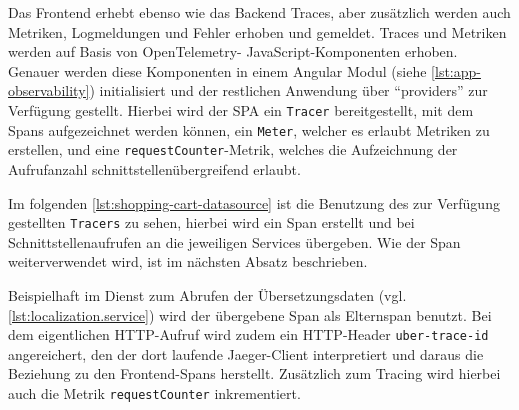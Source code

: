 Das Frontend erhebt ebenso wie das Backend Traces, aber zusätzlich werden auch Metriken, Logmeldungen und Fehler erhoben und gemeldet. Traces und Metriken werden auf Basis von OpenTelemetry- JavaScript-Komponenten \cite{OpenTelemetryJS} erhoben. Genauer werden diese Komponenten in einem Angular Modul (siehe \autoref{lst:app-observability}) initialisiert und der restlichen Anwendung über \enquote{providers} zur Verfügung gestellt. Hierbei wird der SPA ein \texttt{Tracer} bereitgestellt, mit dem Spans aufgezeichnet werden können, ein \texttt{Meter}, welcher es erlaubt Metriken zu erstellen, und eine \texttt{requestCounter}-Metrik, welches die Aufzeichnung der Aufrufanzahl schnittstellenübergreifend erlaubt.



Im folgenden \autoref{lst:shopping-cart-datasource} ist die Benutzung des zur Verfügung gestellten \texttt{Tracers} zu sehen, hierbei wird ein Span erstellt und bei Schnittstellenaufrufen an die jeweiligen Services übergeben. Wie der Span weiterverwendet wird, ist im nächsten Absatz beschrieben.



Beispielhaft im Dienst zum Abrufen der Übersetzungsdaten (vgl. \autoref{lst:localization.service}) wird der übergebene Span als Elternspan benutzt. Bei dem eigentlichen HTTP-Aufruf wird zudem ein HTTP-Header \texttt{uber-trace-id} angereichert, den der dort laufende Jaeger-Client interpretiert \cite{JaegerClient} und daraus die Beziehung zu den Frontend-Spans herstellt. Zusätzlich zum Tracing wird hierbei auch die Metrik \texttt{requestCounter} inkrementiert.



